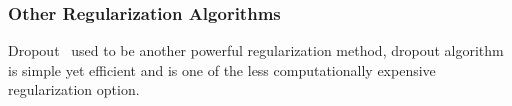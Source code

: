 \subsubsection{Other Regularization Algorithms}

Dropout~\cite{JMLR:v15:srivastava14a} used to be another powerful regularization method, dropout algorithm is simple yet efficient and is one of the less computationally expensive regularization option. 